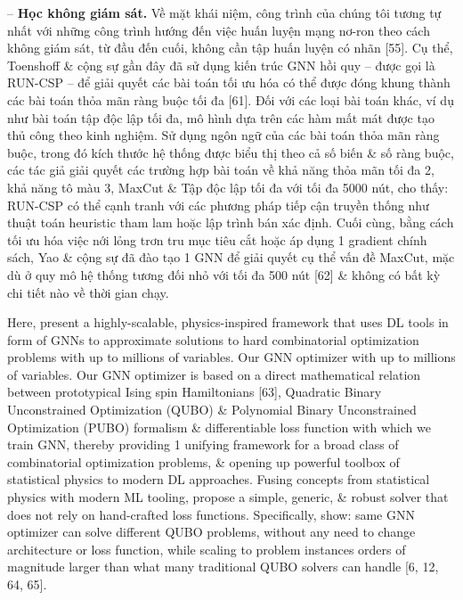 \documentclass{article}
\begin{document}
\begin{itemize}
    -- {\bf Học không giám sát.} Về mặt khái niệm, công trình của chúng tôi tương tự nhất với những công trình hướng đến việc huấn luyện mạng nơ-ron theo cách không giám sát, từ đầu đến cuối, không cần tập huấn luyện có nhãn [55]. Cụ thể, Toenshoff \& cộng sự gần đây đã sử dụng kiến trúc GNN hồi quy -- được gọi là RUN-CSP -- để giải quyết các bài toán tối ưu hóa có thể được đóng khung thành các bài toán thỏa mãn ràng buộc tối đa [61]. Đối với các loại bài toán khác, ví dụ như bài toán tập độc lập tối đa, mô hình dựa trên các hàm mất mát được tạo thủ công theo kinh nghiệm. Sử dụng ngôn ngữ của các bài toán thỏa mãn ràng buộc, trong đó kích thước hệ thống được biểu thị theo cả số biến \& số ràng buộc, các tác giả giải quyết các trường hợp bài toán về khả năng thỏa mãn tối đa 2, khả năng tô màu 3, MaxCut \& Tập độc lập tối đa với tối đa 5000 nút, cho thấy: RUN-CSP có thể cạnh tranh với các phương pháp tiếp cận truyền thống như thuật toán heuristic tham lam hoặc lập trình bán xác định. Cuối cùng, bằng cách tối ưu hóa việc nới lỏng trơn tru mục tiêu cắt hoặc áp dụng 1 gradient chính sách, Yao \& cộng sự đã đào tạo 1 GNN để giải quyết cụ thể vấn đề MaxCut, mặc dù ở quy mô hệ thống tương đối nhỏ với tối đa 500 nút [62] \& không có bất kỳ chi tiết nào về thời gian chạy.

    Here, present a highly-scalable, physics-inspired framework that uses DL tools in form of GNNs to approximate solutions to hard combinatorial optimization problems with up to millions of variables. Our GNN optimizer with up to millions of variables. Our GNN optimizer is based on a direct mathematical relation between prototypical Ising spin Hamiltonians [63], Quadratic Binary Unconstrained Optimization (QUBO) \& Polynomial Binary Unconstrained Optimization (PUBO) formalism \& differentiable loss function with which we train GNN, thereby providing 1 unifying framework for a broad class of combinatorial optimization problems, \& opening up powerful toolbox of statistical physics to modern DL approaches. Fusing concepts from statistical physics with modern ML tooling, propose a simple, generic, \& robust solver that does not rely on hand-crafted loss functions. Specifically, show: same GNN optimizer can solve different QUBO problems, without any need to change architecture or loss function, while scaling to problem instances orders of magnitude larger than what many traditional QUBO solvers can handle [6, 12, 64, 65].


\end{itemize}
\end{document}
